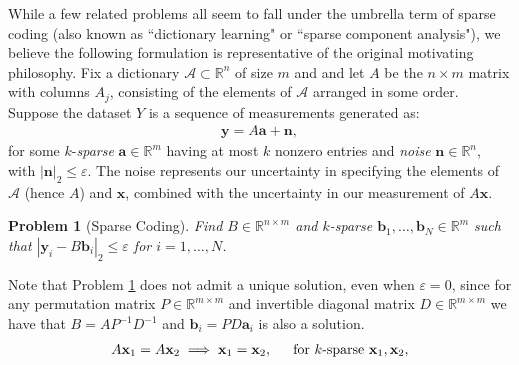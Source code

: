 \documentclass[journal, twocolumn]{IEEEtran}
\newtheorem{problem}{Problem}
\begin{document}
While a few related problems all seem to fall under the umbrella term of sparse coding (also known as ``dictionary learning" or ``sparse component analysis"), we believe the following formulation is representative of the original motivating philosophy. Fix a dictionary $\mathcal{A} \subset \mathbb{R}^n$ of size $m$ and and let $A$ be the $n \times m$ matrix with columns $A_j$, consisting of the elements of $\mathcal{A}$ arranged in some order. Suppose the dataset $Y$ is a sequence of measurements generated as:
\begin{align}\label{LinearModel}
\mathbf{y} = A\mathbf{a} + \mathbf{n},
\end{align}
for some $k$-\emph{sparse} $\mathbf{a} \in \mathbb{R}^m$ having at most $k$ nonzero entries and \emph{noise} $\mathbf{n} \in \mathbb{R}^n$, with $|\mathbf{n}|_2 \leq \varepsilon$. The noise represents our uncertainty in specifying the elements of $\mathcal{A}$ (hence $A$) and $\mathbf{x}$, combined with the uncertainty in our measurement of $A\mathbf{x}$.

\begin{problem}[Sparse Coding]\label{InverseProblem}
Find $B \in \mathbb{R}^{n \times m}$ and $k$-sparse $\mathbf{b}_1, \ldots, \mathbf{b}_N \in \mathbb{R}^m$ such that $|\mathbf{y}_i - B\mathbf{b}_i|_2 \leq \varepsilon$ for $i = 1, \ldots, N$.
\end{problem}

Note that Problem \ref{InverseProblem} does not admit a unique solution, even when $\varepsilon = 0$, since for any permutation matrix $P \in \mathbb{R}^{m \times m}$ and invertible diagonal matrix $D \in \mathbb{R}^{m \times m}$ we have that $B = AP^{-1}D^{-1}$ and $\mathbf{b}_i = PD\mathbf{a}_i$ is also a solution. 
\begin{align}\label{SparkCondition}
A\mathbf{x}_1 = A\mathbf{x}_2 \implies \mathbf{x}_1 = \mathbf{x}_2,\indent \text{for $k$-sparse } \mathbf{x}_1, \mathbf{x}_2,
\end{align}
\end{document}
